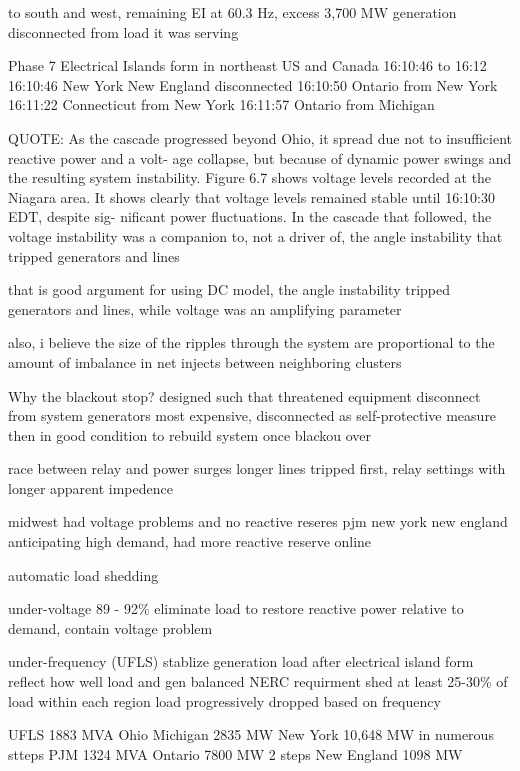 to south and west, remaining EI at 60.3 Hz, excess 3,700 MW generation disconnected from load it was serving


Phase 7
Electrical Islands form in northeast US and Canada
16:10:46 to 16:12
16:10:46 New York New England disconnected
16:10:50 Ontario from New York
16:11:22 Connecticut from New York
16:11:57 Ontario from Michigan


QUOTE: As the cascade progressed beyond Ohio, it spread due not to insufficient reactive power and a volt- age collapse, but because of dynamic power swings and the resulting system instability. Figure 6.7 shows voltage levels recorded at the Niagara area. It shows clearly that voltage levels remained stable until 16:10:30 EDT, despite sig- nificant power fluctuations. In the cascade that followed, the voltage instability was a companion to, not a driver of, the angle instability that tripped generators and lines


that is good argument for using DC model, the angle instability tripped generators and lines, while voltage was an amplifying parameter

also, i believe the size of the ripples through the system are proportional to the amount of imbalance in net injects between neighboring clusters



Why the blackout stop?
designed such that threatened equipment disconnect from system
generators most expensive, disconnected as self-protective measure
then in good condition to rebuild system once blackou over

race between relay and power surges
longer lines tripped first,
relay settings with longer apparent impedence

midwest had voltage problems and no reactive reseres
pjm new york new england anticipating high demand, had more reactive reserve online


automatic load shedding

under-voltage
89 - 92\%
eliminate load to restore reactive power relative to demand, 
contain voltage problem

under-frequency (UFLS)
stablize generation load after electrical island form
reflect how well load and gen balanced
NERC requirment shed at least 25-30\% of load within each region
load progressively dropped based on frequency

UFLS
1883 MVA Ohio
Michigan 2835 MW
New York 10,648 MW in numerous stteps
PJM 1324 MVA
Ontario 7800 MW 2 steps
New England 1098 MW

